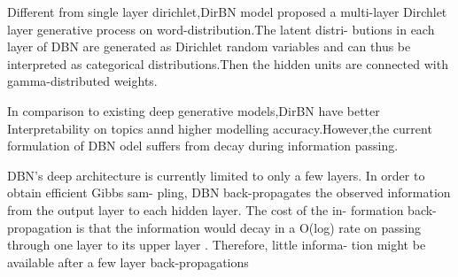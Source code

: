 Different from single layer dirichlet,DirBN model proposed a multi-layer Dirchlet layer generative process on word-distribution.The latent distri-
butions in each layer of DBN are generated as Dirichlet
random variables and can thus be interpreted as categorical
distributions.Then  the hidden units are connected with gamma-distributed weights.

In comparison to existing deep generative models,DirBN have better Interpretability on topics annd higher modelling accuracy.However,the current formulation of DBN odel suffers from decay during information passing.

DBN’s deep architecture is currently limited to
only a few layers. In order to obtain efficient Gibbs sam-
pling, DBN back-propagates the observed information from
the output layer to each hidden layer. The cost of the in-
formation back-propagation is that the information would
decay in a O(log) rate on passing through one layer to its
upper layer \cite{Zhou}. Therefore, little informa-
tion might be available after a few layer back-propagations
